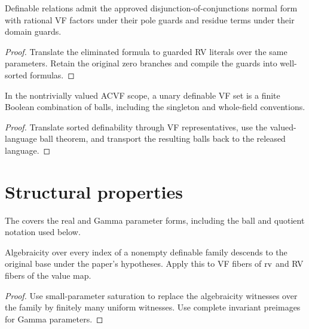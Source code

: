 \begin{definition}
\label{def:normal-form}
\leanok
Definable relations admit the approved disjunction-of-conjunctions
normal form with rational VF factors under their pole guards and
residue terms under their domain guards.
\end{definition}
\begin{proof}
\leanok
{}
Translate the eliminated formula to guarded RV literals over the same
parameters. Retain the original zero branches and compile the guards
into well-sorted formulas.
\end{proof}

\begin{theorem}[2.8. C-minimality]
\label{thm:c-minimality}
\leanok
In the nontrivially valued ACVF scope, a unary definable VF set is a
finite Boolean combination of balls, including the singleton and
whole-field conventions.
\end{theorem}
\begin{proof}
\leanok
{}
Translate sorted definability through VF representatives, use the
valued-language ball theorem, and transport the resulting balls back
to the released language.
\end{proof}

\section{Structural properties}

The  covers the real and
Gamma parameter forms, including the ball and quotient notation used below.

\begin{lemma}
\label{lem:algebraic-descent}
\leanok
Algebraicity over every index of a nonempty definable family descends
to the original base under the paper's hypotheses. Apply this to VF
fibers of \(\operatorname{rv}\) and RV fibers of the value map.
\end{lemma}
\begin{proof}
\leanok
Use small-parameter saturation to replace the algebraicity witnesses
over the family by finitely many uniform witnesses. Use complete
invariant preimages for Gamma parameters.
\end{proof}

